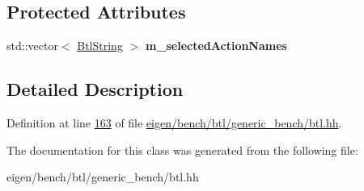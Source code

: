 \subsection*{Protected Attributes}
\begin{DoxyCompactItemize}
\item 
\mbox{\label{class_btl_config_a49163a331254016f426a674c13c19bcb}} 
std\+::vector$<$ \hyperlink{class_btl_string}{Btl\+String} $>$ {\bfseries m\+\_\+selected\+Action\+Names}
\end{DoxyCompactItemize}


\subsection{Detailed Description}


Definition at line \hyperlink{eigen_2bench_2btl_2generic__bench_2btl_8hh_source_l00163}{163} of file \hyperlink{eigen_2bench_2btl_2generic__bench_2btl_8hh_source}{eigen/bench/btl/generic\+\_\+bench/btl.\+hh}.



The documentation for this class was generated from the following file\+:\begin{DoxyCompactItemize}
\item 
eigen/bench/btl/generic\+\_\+bench/btl.\+hh\end{DoxyCompactItemize}
